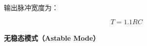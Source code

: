 












输出脉冲宽度为：

\begin{equation}
T = 1.1 RC \label{eq:555-monostable}
\end{equation}

\paragraph{无稳态模式（Astable Mode）}

